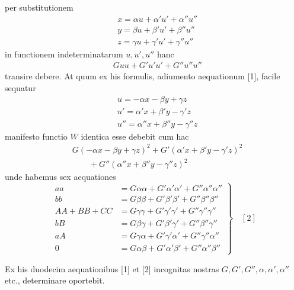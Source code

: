 per substitutionem
\[
\begin{aligned}
&x=\alpha u+\alpha'u'+\alpha''u''\\[6pt]
&y=\beta u+\beta'u'+\beta''u''\\[6pt]
&z=\gamma u+\gamma'u'+\gamma''u''
\end{aligned}
\]
in functionem indeterminatarum $u,u',u''$ hanc
\[
\begin{aligned}
&Guu+G'u'u'+G''u''u''
\end{aligned}
\]
transire debere. At quum ex his formulis, adiumento aequationum [1], facile
sequatur
\[
\begin{aligned}
&u=-\alpha x-\beta y+\gamma z\\[6pt]
&u'=\alpha'x+\beta'y-\gamma'z\\[6pt]
&u''=\alpha''x+\beta''y-\gamma''z
\end{aligned}
\]
manifesto functio $W$ identica esse debebit cum hac
\[
\begin{aligned}
&G(-\alpha x-\beta y+\gamma z)^2
+G'(\alpha'x+\beta'y-\gamma'z)^2
\\[6pt]
&\qquad{}+G''(\alpha''x+\beta''y-\gamma''z)^2
\end{aligned}
\]
unde habemus sex aequationes
\[
\left.
\begin{aligned}
aa&=G\alpha\alpha+G'\alpha'\alpha'+G''\alpha''\alpha''\\[5pt]
bb&=G\beta\beta+G'\beta'\beta'+G''\beta''\beta''\\[5pt]
AA+BB+CC&=G\gamma\gamma+G'\gamma'\gamma'+G''\gamma''\gamma''\\[5pt]
bB&=G\beta\gamma+G'\beta'\gamma'+G''\beta''\gamma''\\[5pt]
aA&=G\gamma\alpha+G'\gamma'\alpha'+G''\gamma''\alpha''\\[5pt]
0&=G\alpha\beta+G'\alpha'\beta'+G''\alpha''\beta''
\end{aligned}
\right\}\quad [2]
\]

Ex his duodecim aequationibus [1] et [2] incognitas nostras $G,\allowbreak G',\allowbreak G'',\allowbreak \alpha,\allowbreak \alpha',\allowbreak \alpha''$
etc., determinare oportebit.

